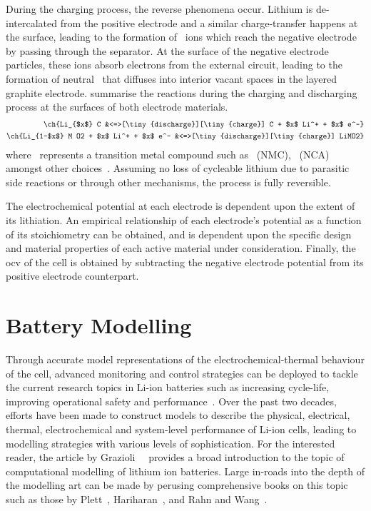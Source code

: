 During  the   charging  process,  the   reverse  phenomena  occur.   Lithium  is
de-intercalated  from  the  positive  electrode and  a  similar  charge-transfer
happens  at  the surface,  leading  to  the  formation of  ~ions  which
reach  the  negative  electrode  by   passing  through  the  separator.  At  the
surface of  the negative electrode  particles, these ions absorb  electrons from
the  external  circuit,  leading  to the  formation  of  neutral~  that
diffuses  into  interior  vacant  spaces  in  the  layered  graphite  electrode.
 summarise the  reactions during the
charging and discharging process at the surfaces of both electrode materials.
\begin{align}
    \ch{Li_{$x$} C                            &<=>[\tiny{discharge}][\tiny{charge}] C + $x$ Li^+ + $x$ e^-}\label{eq:NegElectrodeRxn}\\
    \ch{Li_{1-$x$} M O2 + $x$ Li^+  + $x$ e^- &<=>[\tiny{discharge}][\tiny{charge}] LiMO2}\label{eq:PosElectrodeRxn}
\end{align}
where    ~represents    a    transition   metal    compound   such    as
~(NMC),   ~(NCA)
amongst other  choices~\cite{Reddy2011}. Assuming  no loss of  cycleable lithium
due to  parasitic side  reactions or  through other  mechanisms, the  process is
fully reversible.


The electrochemical potential at each electrode  is dependent upon the extent of
its  lithiation. An  empirical  relationship of  each  electrode's potential  as
a  function  of  its  stoichiometry  can be  obtained,  and  is  dependent  upon
the  specific design  and  material  properties of  each  active material  under
consideration. Finally, the \gls{ocv} of the cell is obtained by subtracting the
negative electrode potential from its positive electrode counterpart.


\section{Battery Modelling}

Through accurate model representations  of the electrochemical-thermal behaviour
of  the cell,  advanced monitoring  and control  strategies can  be deployed  to
tackle  the current  research  topics  in Li-ion  batteries  such as  increasing
cycle-life,  improving  operational   safety  and  performance~\cite{Plett2015}.
Over  the past  two  decades, efforts  have  been made  to  construct models  to
describe  the physical,  electrical, thermal,  electrochemical and  system-level
performance  of  Li-ion cells,  leading  to  modelling strategies  with  various
levels  of   sophistication.  For   the  interested   reader,  the   article  by
Grazioli~\etal~\cite{Grazioli2016a} provides  a broad introduction to  the topic
of computational  modelling of  lithium ion batteries.  Large in-roads  into the
depth of the modelling  art can be made by perusing  comprehensive books on this
topic such  as those by  Plett~\cite{Plett2015}, Hariharan~\cite{Hariharan2017},
and Rahn and Wang~\cite{Rahn2013}.

